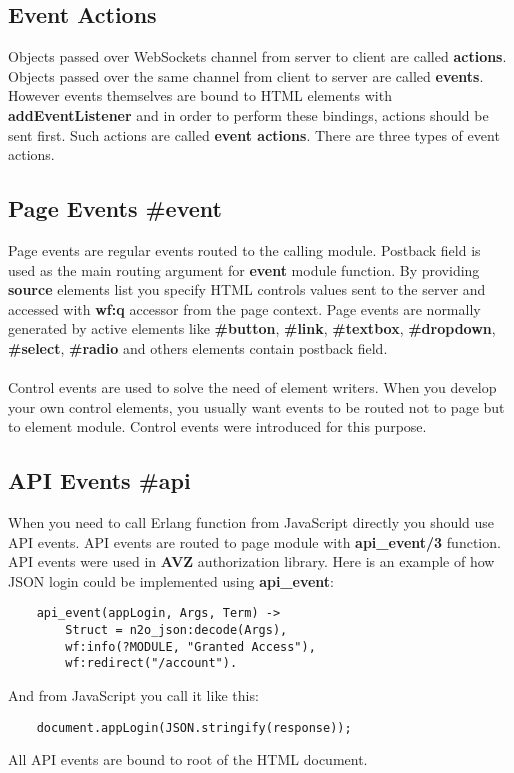 \subsection*{Event Actions}
Objects passed over WebSockets channel from server to client are called {\bf actions}.
Objects passed over the same channel from client to server are called {\bf events}. However
events themselves are bound to HTML elements with {\bf addEventListener} and in order to perform these bindings,
actions should be sent first. Such actions are called {\bf event actions}. There are three types of event actions.

\subsection{Page Events \#event}
Page events are regular events routed to the calling module. Postback field is used as the main
routing argument for {\bf event} module function. By providing {\bf source} elements list you specify
HTML controls values sent to the server and accessed with {\bf wf:q} accessor from the page context.
Page events are normally generated by active elements like {\bf \#button}, {\bf \#link},
{\bf \#textbox}, {\bf \#dropdown}, {\bf \#select}, {\bf \#radio} and others elements
contain postback field.

\paragraph{}
Control events are used to solve the need of element writers. When you develop your
own control elements, you usually want events to be routed not to page but to element module.
Control events were introduced for this purpose.

\subsection{API Events \#api}
When you need to call Erlang function from JavaScript directly you should use API events.
API events are routed to page module with {\bf api\_event/3} function. API events were
used in {\bf AVZ} authorization library. Here is an example of how JSON login could be
implemented using {\bf api\_event}:

\vspace{1\baselineskip}
\begin{lstlisting}
    api_event(appLogin, Args, Term) ->
        Struct = n2o_json:decode(Args),
        wf:info(?MODULE, "Granted Access"),
        wf:redirect("/account").
\end{lstlisting}
\vspace{1\baselineskip}
And from JavaScript you call it like this:
\vspace{1\baselineskip}
\begin{lstlisting}
    document.appLogin(JSON.stringify(response));
\end{lstlisting}
\vspace{1\baselineskip}
All API events are bound to root of the HTML document.


